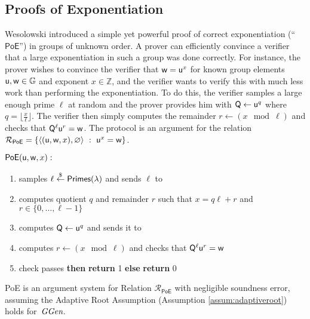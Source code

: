 \subsection{Proofs of Exponentiation}
Wesolowski \cite{EC:Wesolowski19} introduced a simple yet powerful proof of correct exponentiation (``$\mathsf{PoE}$'') in groups of unknown order. A prover can efficiently convince a verifier that a large exponentiation in such a group was done correctly. For instance, the prover wishes to convince the verifier that $\mathsf{w} = \mathsf{u}^x$ for known group elements $\mathsf{u}, \mathsf{w} \in \mathbb{G}$ and exponent $x \in \mathbb{Z}$, and the verifier wants to verify this with much less work than performing the exponentiation. To do this, the verifier samples a large enough prime $\ell$ at random and the prover provides him with $\mathsf{Q} \gets \mathsf{u}^q$ where $q = \lfloor \frac{x}{\ell} \rfloor$. The verifier then simply computes the remainder $r \gets (x \mod \ell)$ and checks that $\mathsf{Q}^\ell\mathsf{u}^r = \mathsf{w}$. The protocol is an argument for the relation $\mathcal{R}_\mathsf{PoE} = \left\{ \langle(\mathsf{u}, \mathsf{w}, x), \varnothing\rangle \ : \ \mathsf{u}^x = \mathsf{w} \right\}$.
\noindent\begin{mdframed}[userdefinedwidth=\textwidth]
\begin{minipage}{\textwidth}
	\begin{flushleft}
	$\textsf{{PoE}}(\mathsf{u}, \mathsf{w}, x):$
	\begin{enumerate}[nolistsep]
		    \item \verifier samples $\ell \overset{\$}{\gets} \textsf{Primes}(\lambda)$ and sends $\ell$ to \prover
		    \item \prover computes quotient $q$ and remainder $r$ such that $x = q\ell + r$ and $r \in \{0, \ldots, \ell-1\}$
		    \item \prover computes $\mathsf{Q} \gets \mathsf{u}^q$ and sends it to \verifier
		    \item \verifier computes $r \gets (x \mod \ell)$ and checks that $\mathsf{Q}^\ell\mathsf{u}^r = \mathsf{w}$
		    \item \pcif{}check passes \textbf{then} \textbf{return} 1 \textbf{else} \textbf{return} 0
		\end{enumerate}
	\end{flushleft}
\end{minipage}
\end{mdframed}

\begin{lemma}
\label{lem:poe}
\textsf{PoE} is an argument system for  Relation $\mathcal{R}_\textsf{PoE}$ with negligible soundness error,
assuming the Adaptive Root Assumption (Assumption \ref{assum:adaptiveroot}) holds for~$\textit{GGen}$.
\end{lemma}

